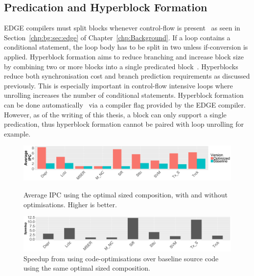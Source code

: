 \subsection{Predication and Hyperblock Formation}
EDGE compilers must split blocks whenever control-flow is present~\cite{smith2006edge} as seen in Section~\ref{chp:bg:sec:edge} of Chapter~\ref{chp:Background}.
If a loop contains a conditional statement, the loop body has to be split in two unless if-conversion is applied.
Hyperblock formation aims to reduce branching and increase block size by combining two or more blocks into a single predicated block~\cite{smith2006edge}.
Hyperblocks reduce both synchronisation cost and branch prediction requirements as discussed previously.
This is especially important in control-flow intensive loops where unrolling increases the number of conditional statements.
Hyperblock formation can be done automatically~\cite{smith2006edge} via a compiler flag provided by the EDGE compiler.
However, as of the writing of this thesis, a block can only support a single predication, thus hyperblock formation cannot be paired with loop unrolling for example.

\begin{figure}[t]
     \centering
     \includegraphics[width=\textwidth]{cases-paper/graphics/Exploration/ipc_comp.pdf}
\vspace*{-3em}
     \caption{Average IPC using the optimal sized composition, with and without optimisations. Higher is better.}
     \label{fig:ipccom}
    \centering
    \includegraphics[width=\textwidth]{cases-paper/graphics/Exploration/comp_speed.pdf}
\vspace*{-8mm}
    \caption{Speedup from using code-optimisations over baseline source code using the same optimal sized composition.}
    \label{fig:speedcomp}
\vspace{5mm}
\end{figure}

